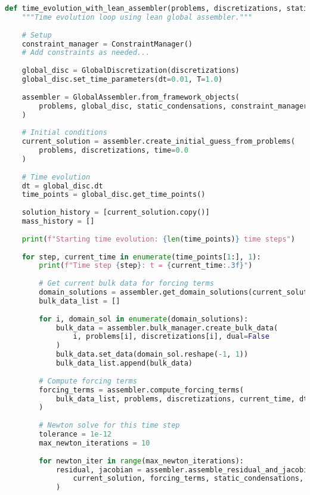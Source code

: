 \begin{lstlisting}[language=Python, caption=Time Evolution with Lean Assembler]
def time_evolution_with_lean_assembler(problems, discretizations, static_condensations):
    """Time evolution loop using lean global assembler."""
    
    # Setup
    constraint_manager = ConstraintManager()
    # Add constraints as needed...
    
    global_disc = GlobalDiscretization(discretizations)
    global_disc.set_time_parameters(dt=0.01, T=1.0)
    
    assembler = GlobalAssembler.from_framework_objects(
        problems, global_disc, static_condensations, constraint_manager
    )
    
    # Initial conditions
    current_solution = assembler.create_initial_guess_from_problems(
        problems, discretizations, time=0.0
    )
    
    # Time evolution
    dt = global_disc.dt
    time_points = global_disc.get_time_points()
    
    solution_history = [current_solution.copy()]
    mass_history = []
    
    print(f"Starting time evolution: {len(time_points)} time steps")
    
    for step, current_time in enumerate(time_points[1:], 1):
        print(f"Time step {step}: t = {current_time:.3f}")
        
        # Get current bulk data for forcing terms
        domain_solutions = assembler.get_domain_solutions(current_solution)
        bulk_data_list = []
        
        for i, domain_sol in enumerate(domain_solutions):
            bulk_data = assembler.bulk_manager.create_bulk_data(
                i, problems[i], discretizations[i], dual=False
            )
            bulk_data.set_data(domain_sol.reshape(-1, 1))
            bulk_data_list.append(bulk_data)
        
        # Compute forcing terms
        forcing_terms = assembler.compute_forcing_terms(
            bulk_data_list, problems, discretizations, current_time, dt
        )
        
        # Newton solve for this time step
        tolerance = 1e-12
        max_newton_iterations = 10
        
        for newton_iter in range(max_newton_iterations):
            residual, jacobian = assembler.assemble_residual_and_jacobian(
                current_solution, forcing_terms, static_condensations, current_time
            )
            

\end{lstlisting}
